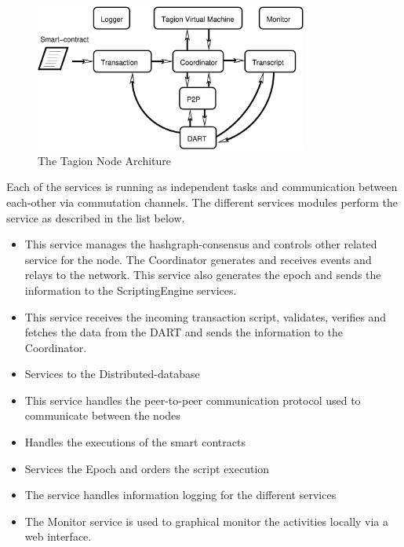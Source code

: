\begin{figure}[H]
	\centering
	\includegraphics[width=0.8\textwidth]{fig/node_service.eps}
	\caption{The Tagion Node Architure}
	\label{fig:node_service}
\end{figure}


Each of the services is running as independent tasks and communication between each-other via commutation channels. The different services modules perform the service as described in the list below.

\begin{itemize}
	\item[\bfit{Coordinator}] This service manages the hashgraph-consensus and controls other related service for the node. 
	The Coordinator generates and receives events and relays to the network. This service also generates the epoch and sends the information to the ScriptingEngine services.
	\item[\bfit{Transaction}] This service receives the incoming transaction script, validates, verifies and fetches the data from the DART and sends the information to the Coordinator.
	\item[\bfit{DART}] Services to the Distributed-database
	\item[\bfit{P2P}] This service handles the peer-to-peer communication protocol used to communicate between the nodes
	\item[\bfit{TVM}] Handles the executions of the smart contracts
	\item[\bfit{Transcript}] Services the Epoch and orders the script execution
	\item[\bfit{Logger}] The service handles information logging for the different services
	\item[\bfit{Monitor}] The Monitor service is used to graphical monitor the activities locally via a web interface.
\end{itemize}
